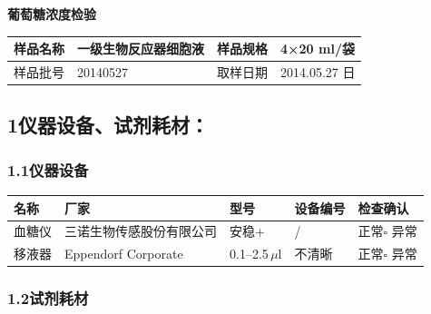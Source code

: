 \documentclass[UTF8,10pt,a4paper,fontset=fandol]{ctexart}
\newcommand{\fieldvalue}[1]{#1}
\newcommand{\handwritten}[1]{#1}
\begin{document}
\noindent\textbf{葡萄糖浓度检验}

\begin{tabularx}{\textwidth}{|p{2.4cm}|X|p{2.4cm}|X|}
\hline
样品名称 &
\fieldvalue{一级生物反应器细胞液} &
样品规格 &
\fieldvalue{\handwritten{4×20}} ml/袋
\\ \hline
样品批号 &
\fieldvalue{\handwritten{20140527}} &
取样日期 &
\fieldvalue{\handwritten{2014.05.27}} 日
\\ \hline
\end{tabularx}

\subsection*{1\quad 仪器设备、试剂耗材：}

\subsubsection*{1.1\quad 仪器设备}

\begin{tabularx}{\textwidth}{|p{2.1cm}|X|p{2.1cm}|p{2.4cm}|p{2.7cm}|}
\hline
名称 & 厂家 & 型号 & 设备编号 & 检查确认
\\ \hline
血糖仪 & 三诺生物传感股份有限公司 & 安稳+ &
\fieldvalue{\handwritten{/}} &
\fieldvalue{\handwritten{\checkmark}} 正常\quad $\square$ 异常
\\ \hline
移液器 & Eppendorf Corporate & 0.1--2.5\,$\mu$l &
\fieldvalue{\handwritten{不清晰}} &
\fieldvalue{\handwritten{\checkmark}} 正常\quad $\square$ 异常
\\ \hline
\end{tabularx}

\subsubsection*{1.2\quad 试剂耗材}
\end{document}
